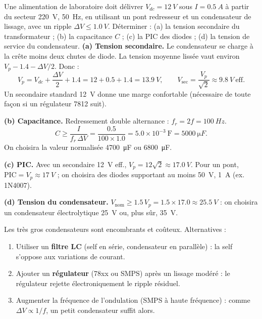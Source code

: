 \documentclass[11pt]{article}
\begin{document}
\begin{exoresolu}
Une alimentation de laboratoire doit délivrer $V_{dc} = \SI{12}{V}$ sous $I = \SI{0.5}{A}$ à partir du secteur \SI{220}{V}, \SI{50}{Hz}, en utilisant un pont redresseur et un condensateur de lissage, avec un ripple $\Delta V \leq \SI{1.0}{V}$. Déterminer : (a) la tension secondaire du transformateur ; (b) la capacitance $C$ ; (c) la PIC des diodes ; (d) la tension de service du condensateur.
\tcblower
\textbf{(a) Tension secondaire.} Le condensateur se charge à la crête moins deux chutes de diode. La tension moyenne lissée vaut environ $V_p - 1.4 - \Delta V/2$. Donc :
\[
V_p = V_{dc} + \frac{\Delta V}{2} + 1.4 = 12 + 0.5 + 1.4 = \SI{13.9}{V},
\qquad V_{\text{sec}} = \frac{V_p}{\sqrt{2}} \approx \SI{9.8}{V}\ \text{eff.}
\]
Un secondaire standard \SI{12}{V} donne une marge confortable (nécessaire de toute façon si un régulateur 7812 suit).

\textbf{(b) Capacitance.} Redressement double alternance : $f_r = 2f = \SI{100}{Hz}$.
\[
C \geq \frac{I}{f_r\,\Delta V} = \frac{0.5}{100 \times 1.0} = 5.0\times10^{-3}\ \mathrm{F} = \SI{5000}{\micro F}.
\]
On choisira la valeur normalisée \SI{4700}{\micro F} ou \SI{6800}{\micro F}.

\textbf{(c) PIC.} Avec un secondaire \SI{12}{V} eff., $V_p = 12\sqrt{2} \approx \SI{17.0}{V}$. Pour un pont, $\mathrm{PIC} = V_p \approx \SI{17}{V}$ ; on choisira des diodes supportant au moins \SI{50}{V}, \SI{1}{A} (ex. 1N4007).

\textbf{(d) Tension du condensateur.} $V_{\text{nom}} \geq 1.5\,V_p = 1.5 \times 17.0 \approx \SI{25.5}{V}$ : on choisira un condensateur électrolytique \SI{25}{V} ou, plus sûr, \SI{35}{V}.
\end{exoresolu}

\begin{methode}
Les très gros condensateurs sont encombrants et coûteux. Alternatives :
\begin{enumerate}
\item Utiliser un \textbf{filtre LC} (self en série, condensateur en parallèle) : la self s'oppose aux variations de courant.
\item Ajouter un \textbf{régulateur} (78xx ou SMPS) après un lissage modéré : le régulateur rejette électroniquement le ripple résiduel.
\item Augmenter la fréquence de l'ondulation (SMPS à haute fréquence) : comme $\Delta V \propto 1/f$, un petit condensateur suffit alors.
\end{enumerate}
\end{methode}
\end{document}
